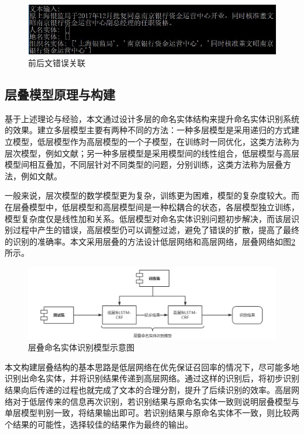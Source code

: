 \documentclass[winfonts,master,oneside,nobackinfo]{njuthesis}
\begin{document}
\begin{figure}[H]
\centering
\begin{minipage}[t]{\textwidth}
\includegraphics[width=1\textwidth]{./figure/前后文错误关联.jpg}
\caption{前后文错误关联}
\label{mix}
\end{minipage}
\end{figure}

\subsection{层叠模型原理与构建}

基于上述理论与经验，本文通过设计多层的命名实体结构来提升命名实体识别系统的效果。建立多层模型主要有两种不同的方法：一种多层模型是采用递归的方式建立模型，低层模型作为高层模型的一个子模型，在训练时一同优化，这类方法称为层次模型，例如文献\cite{taobao}；另一种多层模型是采用模型间的线性组合，低层模型与高层模型间相互叠加，不同层针对不同类型的问题，分别训练，这类方法称为层叠方法，例如文献\cite{Yixue,Jia}。

一般来说，层次模型的数学模型更为复杂，训练更为困难，模型的复杂度较大。而在层叠模型中，低层模型和高层模型间是一种松耦合的状态，各层模型独立训练，模型复杂度仅是线性加和关系。低层模型对命名实体识别问题初步解决，而该层识别过程中产生的错误，高层模型仍可以调整过滤，避免了错误的扩散，提高了最终的识别的准确率。本文采用层叠的方法设计低层网络和高层网络，层叠网络如图\ref{casecaed-model}所示。

\begin{figure}[H]
\centering
\includegraphics[width=1\textwidth]{./figure/层叠模型.jpg}
\caption{层叠命名实体识别模型示意图}
\label{casecaed-model}
\end{figure}

本文构建层叠结构的基本思路是低层网络在优先保证召回率的情况下，尽可能多地识别出命名实体，并将识别结果传递到高层网络。通过这样的识别后，将初步识别结果向后传递的过程也就完成了文本的合理分割，提升了后续识别的效率。高层网络对于低层传来的信息再次识别，若识别结果与原命名实体一致则说明层叠模型与单层模型判别一致，将结果输出即可。若识别结果与原命名实体不一致，则比较两个结果的可能性，选择较佳的结果作为最终的输出。
\end{document}
